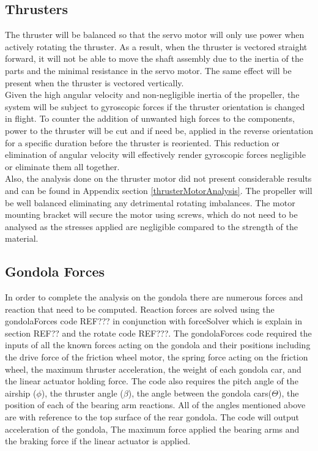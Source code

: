 \documentclass[../main.tex]{subfiles}
\begin{document}
\subsection{Thrusters} \label{thrusterIntro}
The thruster will be balanced so that the servo motor will only use power when actively rotating the thruster. As a result, when the thruster is vectored straight forward, it will not be able to move the shaft assembly due to the inertia of the parts and the minimal resistance in the servo motor. The same effect will be present when the thruster is vectored vertically.\\

Given the high angular velocity and non-negligible inertia of the propeller, the system will be subject to gyroscopic forces if the thruster orientation is changed in flight. To counter the addition of unwanted high forces to the components, power to the thruster will be cut and if need be, applied in the reverse orientation for a specific duration before the thruster is reoriented. This reduction or elimination of angular velocity will effectively render gyroscopic forces negligible or eliminate them all together. \\

Also, the analysis done on the thruster motor did not present considerable results and can be found in Appendix section \ref{thrusterMotorAnalysis}. The propeller will be well balanced eliminating any detrimental rotating imbalances. The motor mounting bracket will secure the motor using screws, which do not need to be analysed as the stresses applied are negligible compared to the strength of the material.

\subsection{Gondola Forces} \label{gondForces}
In order to complete the analysis on the gondola there are numerous forces and reaction that need to be computed. Reaction forces are solved using the gondolaForces code REF??? in conjunction with forceSolver which is explain in section REF?? and  the rotate code REF???. The gondolaForces code required the inputs of all the known forces acting on the gondola and their positions including the drive force of the friction wheel motor, the spring force acting on the friction wheel, the maximum thruster acceleration, the weight of each gondola car, and the linear actuator holding force. The code also requires the pitch angle of the airship ($\phi$), the thruster angle ($\beta$), the angle between the gondola cars($\Theta$), the position of each of the bearing arm reactions. All of the angles mentioned above are with reference to the top surface of the rear gondola. The code will output acceleration of the gondola, The maximum force applied the bearing arms and the braking force if the linear actuator is applied. \\
\end{document}
